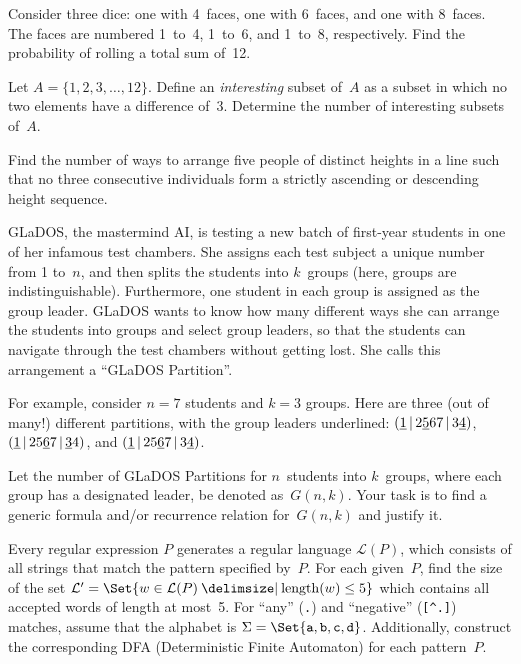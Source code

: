 \documentclass[a4paper,12pt]{article}
\begin{document}
\begin{tasks}[align=right,left=0pt]
    \item Consider three dice: one with 4~faces, one with 6~faces, and one with 8~faces.
    The faces are numbered 1~to~4, 1~to~6, and 1~to~8, respectively.
    Find the probability of rolling a total sum of~12.


    \item Let $A = \{ 1, 2, 3, \dots, 12 \}$.
    Define an \emph{interesting} subset of~$A$ as a subset in which no two elements have a difference of~3.
    Determine the number of interesting subsets of~$A$.


    \item Find the number of ways to arrange five people of distinct heights in a line such that no three consecutive individuals form a strictly ascending or descending height sequence.


    \begingroup
    \item GLaDOS, the mastermind AI, is testing a new batch of first-year students in one of her infamous test chambers.
    She assigns each test subject a unique number from 1 to~$n$, and then splits the students into $k$~groups (here, groups are indistinguishable).
    Furthermore, one student in each group is assigned as the group leader.
    GLaDOS wants to know how many different ways she can arrange the students into groups and select group leaders, so that the students can navigate through the test chambers without getting lost.
    She calls this arrangement a \enquote{GLaDOS Partition}.

    \newcommand*{\leader}[1]{\uline{#1}}
    \newcommand*{\sep}{\,|\,}

    \smallskip
    For example, consider $n = 7$ students and $k = 3$ groups.
    Here are three (out of many!) different partitions, with the group leaders underlined:
    $(\leader{1} \sep 2\leader{5}67 \sep 3\leader{4})$,
    $(\leader{1} \sep 25\leader{6}7 \sep \leader{3}4)$,
    and $(\leader{1} \sep 25\leader{6}7 \sep 3\leader{4})$.

    \smallskip
    Let the number of GLaDOS Partitions for $n$~students into $k$~groups, where each group has a designated leader, be denoted as~$G(n,k)$.
    Your task is to find a generic formula and/or recurrence relation for~$G(n,k)$ and justify it.

    \endgroup


    \item Every regular expression $P$ generates a regular language $\mathcal{L}(P)$, which consists of all strings that match the pattern specified by~$P$.
    For each given~$P$, find the size of the set $\mathcal{L}' =\nobreak \Set{w \in\nobreak \mathcal{L}(P) \given \operatorname{length}(w) \leq 5}$ which contains all accepted words of length at most~5.
    For \enquote{any} (\verb/./) and \enquote{negative} (\verb/[^.]/) matches, assume that the alphabet is $\Sigma = \Set{\texttt{a}, \texttt{b}, \texttt{c}, \texttt{d}}$.
    Additionally, construct the corresponding DFA (Deterministic Finite Automaton) for each pattern~$P$.


\end{tasks}
\end{document}
